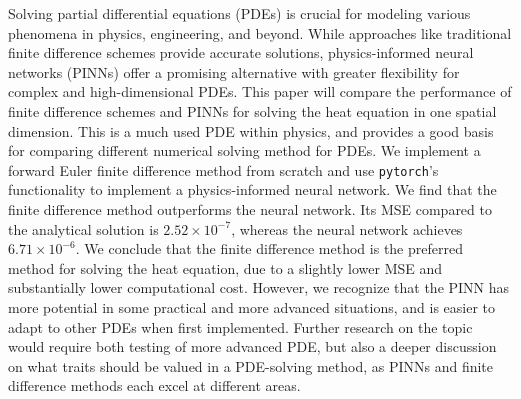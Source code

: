 Solving partial differential equations (PDEs) is crucial for modeling various phenomena in physics, engineering, and beyond.
While approaches like traditional finite difference schemes provide accurate solutions, physics-informed neural networks (PINNs) offer a promising alternative with greater flexibility for complex and high-dimensional PDEs.
This paper will compare the performance of finite difference schemes and PINNs for solving the heat equation in one spatial dimension.
This is a much used PDE within physics, and provides a good basis for comparing different numerical solving method for PDEs.
We implement a forward Euler finite difference method from scratch and use \texttt{pytorch}'s functionality to implement a physics-informed neural network.
We find that the finite difference method outperforms the neural network. 
Its MSE compared to the analytical solution is $2.52 \times 10^{-7}$, whereas the neural network achieves $ 6.71 \times 10^{-6}$. 
We conclude that the finite difference method is the preferred method for solving the heat equation, due to a slightly lower MSE and substantially lower computational cost.
However, we recognize that the PINN has more potential in some practical and more advanced situations, and is easier to adapt to other PDEs when first implemented.
Further research on the topic would require both testing of more advanced PDE, but also a deeper discussion on what traits should be valued in a PDE-solving method, as PINNs and finite difference methods each excel at different areas.